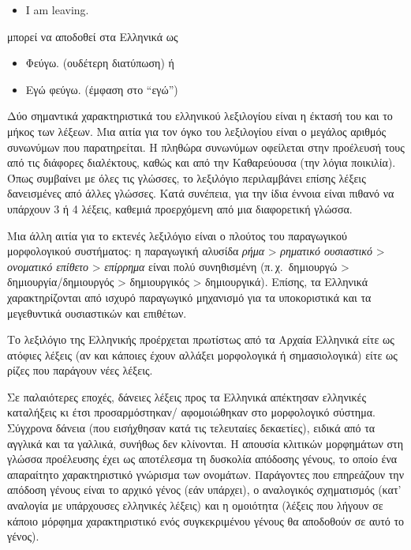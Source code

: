 \documentclass[]{../../metanetpaper}
\begin{document}
\begin{multicols}{2}
\begin{itemize}
\item[] I am leaving.
\end{itemize}

μπορεί να αποδοθεί στα Ελληνικά ως

\begin{itemize}
\item Φεύγω. (ουδέτερη διατύπωση) ή 
\item Εγώ φεύγω. (έμφαση στο “εγώ”)
\end{itemize}

Δύο σημαντικά χαρακτηριστικά του ελληνικού λεξιλογίου είναι η έκτασή του και το μήκος των λέξεων. Μια αιτία για τον όγκο του λεξιλογίου είναι ο μεγάλος αριθμός συνωνύμων που παρατηρείται. Η πληθώρα συνωνύμων οφείλεται στην προέλευσή τους από τις διάφορες διαλέκτους, καθώς και από την Καθαρεύουσα (την λόγια ποικιλία). Όπως συμβαίνει με όλες τις γλώσσες, το λεξιλόγιο περιλαμβάνει επίσης λέξεις δανεισμένες από άλλες γλώσσες. Κατά συνέπεια, για την ίδια έννοια είναι πιθανό να υπάρχουν 3 ή 4 λέξεις, καθεμιά προερχόμενη από μια διαφορετική γλώσσα.

Μια άλλη αιτία για το εκτενές λεξιλόγιο είναι ο πλούτος του παραγωγικού μορφολογικού συστήματος: η παραγωγική αλυσίδα \textit{ρήμα} > \textit{ρηματικό ουσιαστικό} > \textit{ονοματικό επίθετο} > \textit{επίρρημα} είναι πολύ συνηθισμένη (π.\,χ.~δημιουργώ > δημιουργία/δημιουργός > δημιουργικός > δημιουργικά). Επίσης, τα Ελληνικά χαρακτηρίζονται από ισχυρό παραγωγικό μηχανισμό για τα υποκοριστικά και τα μεγεθυντικά ουσιαστικών και επιθέτων.

Το λεξιλόγιο της Ελληνικής προέρχεται πρωτίστως από τα Αρχαία Ελληνικά είτε ως ατόφιες λέξεις (αν και κάποιες έχουν αλλάξει μορφολογικά ή σημασιολογικά) είτε ως ρίζες που παράγουν νέες λέξεις.

Σε παλαιότερες εποχές, δάνειες λέξεις προς τα Ελληνικά απέκτησαν ελληνικές καταλήξεις κι έτσι προσαρμόστηκαν/ αφομοιώθηκαν στο μορφολογικό σύστημα. Σύγχρονα δάνεια (που εισήχθησαν κατά τις τελευταίες δεκαετίες), ειδικά από τα αγγλικά και τα γαλλικά, συνήθως δεν κλίνονται. Η απουσία κλιτικών μορφημάτων στη γλώσσα προέλευσης έχει ως αποτέλεσμα τη δυσκολία απόδοσης γένους, το οποίο ένα απαραίτητο χαρακτηριστικό γνώρισμα των ονομάτων. Παράγοντες που επηρεάζουν την απόδοση γένους είναι το αρχικό γένος (εάν υπάρχει), ο αναλογικός σχηματισμός (κατ' αναλογία με υπάρχουσες ελληνικές λέξεις) και η ομοιότητα (λέξεις που λήγουν σε κάποιο μόρφημα χαρακτηριστικό ενός συγκεκριμένου γένους θα αποδοθούν σε αυτό το γένος).


\end{multicols}
\end{document}
